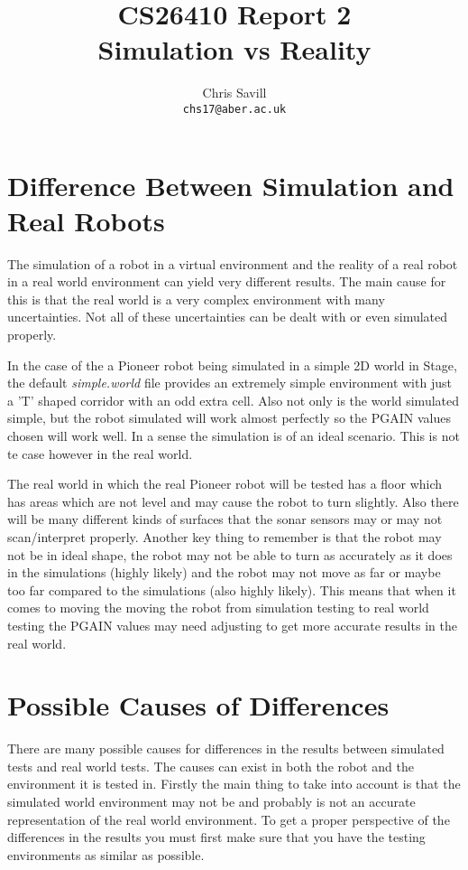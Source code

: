 \documentclass[a4paper,12pt]{article}
\title{CS26410 Report 2\\
Simulation vs Reality}
\author{Chris Savill\\\texttt{chs17@aber.ac.uk}}
\begin{document}
\maketitle
\newpage
\tableofcontents
\newpage

\section{Difference Between Simulation and Real Robots}
The simulation of a robot in a virtual environment and the reality of a real robot in a real world environment can yield very different results. The main cause for this is that the real world is a very complex environment with many uncertainties. Not all of these uncertainties can be dealt with or even simulated properly.

\vspace{5mm}
\noindent In the case of the a Pioneer robot being simulated in a simple 2D world in Stage, the default \textit{simple.world} file provides an extremely simple environment with just a 'T' shaped corridor with an odd extra cell. Also not only is the world simulated simple, but the robot simulated will work almost perfectly so the PGAIN values chosen will work well. In a sense the simulation is of an ideal scenario. This is not te case however in the real world.

\vspace{5mm}
\noindent The real world in which the real Pioneer robot will be tested has a floor which has areas which are not level and may cause the robot to turn slightly. Also there will be many different kinds of surfaces that the sonar sensors may or may not scan/interpret properly. Another key thing to remember is that the robot may not be in ideal shape, the robot may not be able to turn as accurately as it does in the simulations (highly likely) and the robot may not move as far or maybe too far compared to the simulations (also highly likely). This means that when it comes to moving the moving the robot from simulation testing to real world testing the PGAIN values may need adjusting to get more accurate results in the real world.

\vspace{5mm}
\noindent 
\section{Possible Causes of Differences}

\noindent There are many possible causes for differences in the results between simulated tests and real world tests. The causes can exist in both the robot and the environment it is tested in. Firstly the main thing to take into account is that the simulated world environment may not be and probably is not an accurate representation of the real world environment. To get a proper perspective of the differences in the results you must first make sure that you have the testing environments as similar as possible.
\end{document}
